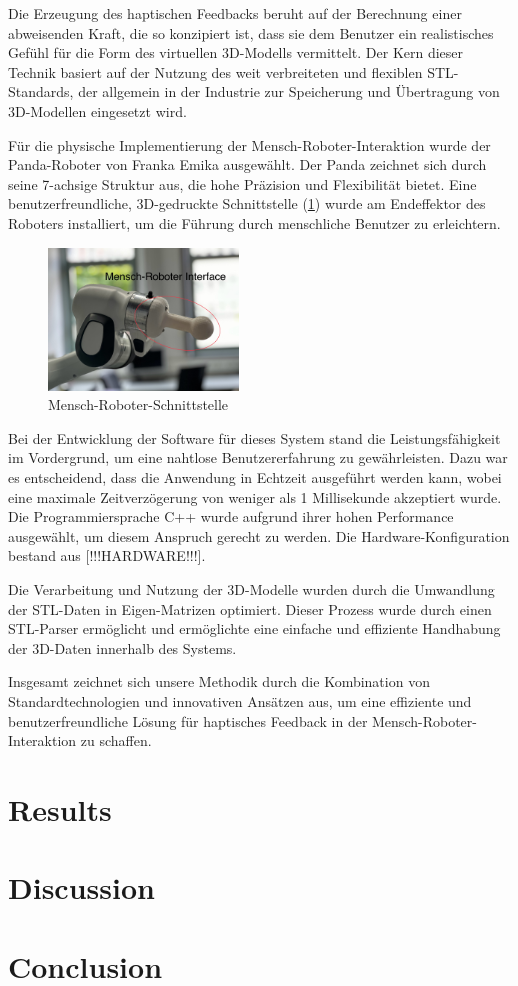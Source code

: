 \documentclass[conference]{IEEEtran}
\begin{document}
Die Erzeugung des haptischen Feedbacks beruht auf der Berechnung einer abweisenden Kraft, die so konzipiert ist, dass sie dem Benutzer ein realistisches Gefühl für die Form des virtuellen 3D-Modells vermittelt. Der Kern dieser Technik basiert auf der Nutzung des weit verbreiteten und flexiblen STL-Standards, der allgemein in der Industrie zur Speicherung und Übertragung von 3D-Modellen eingesetzt wird.

Für die physische Implementierung der Mensch-Roboter-Interaktion wurde der Panda-Roboter von Franka Emika ausgewählt. Der Panda zeichnet sich durch seine 7-achsige Struktur aus, die hohe Präzision und Flexibilität bietet. Eine benutzerfreundliche, 3D-gedruckte Schnittstelle (\ref{fig:nullSpace}) wurde am Endeffektor des Roboters installiert, um die Führung durch menschliche Benutzer zu erleichtern.  

\begin{figure}
    \centering
    \includegraphics[width=0.45\textwidth]{pics/interface.jpeg}
    \caption{Mensch-Roboter-Schnittstelle}
    \label{fig:nullSpace}
\end{figure}

Bei der Entwicklung der Software für dieses System stand die Leistungsfähigkeit im Vordergrund, um eine nahtlose Benutzererfahrung zu gewährleisten. Dazu war es entscheidend, dass die Anwendung in Echtzeit ausgeführt werden kann, wobei eine maximale Zeitverzögerung von weniger als 1 Millisekunde akzeptiert wurde. Die Programmiersprache C++ wurde aufgrund ihrer hohen Performance ausgewählt, um diesem Anspruch gerecht zu werden. Die Hardware-Konfiguration bestand aus [!!!HARDWARE!!!].

Die Verarbeitung und Nutzung der 3D-Modelle wurden durch die Umwandlung der STL-Daten in Eigen-Matrizen optimiert. Dieser Prozess wurde durch einen STL-Parser ermöglicht und ermöglichte eine einfache und effiziente Handhabung der 3D-Daten innerhalb des Systems.

Insgesamt zeichnet sich unsere Methodik durch die Kombination von Standardtechnologien und innovativen Ansätzen aus, um eine effiziente und benutzerfreundliche Lösung für haptisches Feedback in der Mensch-Roboter-Interaktion zu schaffen.

\section{Results}

\section{Discussion}

\section{Conclusion}

\printbibliography
\end{document}
